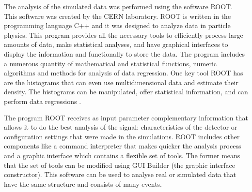 The analysis of the simulated data was performed using the software ROOT. This software was created by the CERN laboratory. ROOT is written in the programming language C++ and it was 
designed to analyze data in particle physics. This program provides all the necessary tools to efficiently process large amounts of data, make statistical analyses, and have graphical interfaces to display the information and functionally to store the data. The program includes a numerous quantity of mathematical and statistical functions, numeric algorithms and methods for analysis of data regression. One key tool ROOT has are the histograms that can even use multidimensional data and estimate their density. The histograms can be manipulated, offer statistical information, and can perform data regressions \cite{Root}. 

The program ROOT receives as input parameter complementary information that allows it to do the best analysis of the signal: characteristics of the detector or configuration settings that were 
made in the simulations. ROOT includes other components like a command interpreter that makes quicker the analysis process and a graphic interface which contains a flexible set of tools. The former
means that the set of tools can be modified using GUI Builder (the graphic interface constructor). This software can be used to analyse real or simulated data that have the same structure and 
consists of many events. 


